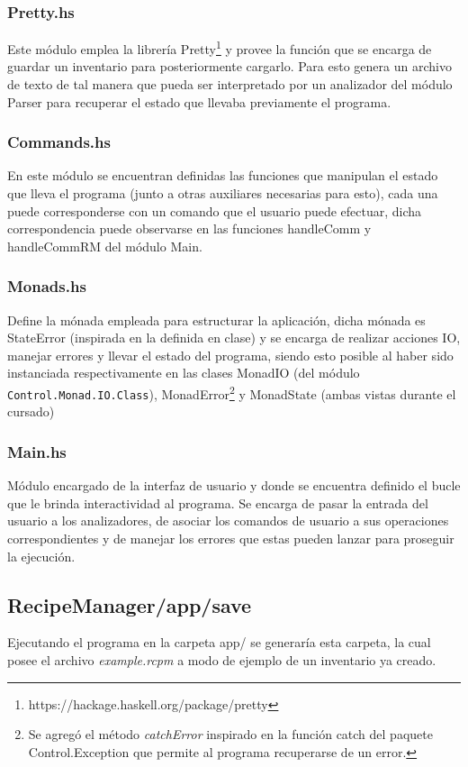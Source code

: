 \documentclass[a4paper]{article}
\begin{document}
\subsubsection*{\small{Pretty.hs}} 
Este módulo emplea la librería Pretty\footnote{https://hackage.haskell.org/package/pretty} y provee la función que se encarga de guardar un inventario para posteriormente cargarlo. Para esto genera un archivo de texto de tal manera que pueda ser interpretado por un analizador del módulo Parser para recuperar el estado que llevaba previamente el programa.

\subsubsection*{\small{Commands.hs}}
En este módulo se encuentran definidas las funciones que manipulan el estado que lleva el programa (junto a otras auxiliares necesarias para esto), cada una puede corresponderse con un comando que el usuario puede efectuar, dicha correspondencia puede observarse en las funciones handleComm y handleCommRM del módulo Main.  

\subsubsection*{\small{Monads.hs}}
Define la mónada empleada para estructurar la aplicación, dicha mónada es StateError (inspirada en la definida en clase) y se encarga de realizar acciones IO, manejar errores y llevar el estado del programa, siendo esto posible al haber sido instanciada respectivamente en las clases MonadIO (del módulo \texttt{Control.Monad.IO.Class}), MonadError\footnote{Se agregó el método \textit {catchError} inspirado en la función catch del paquete Control.Exception que permite al programa recuperarse de un error.} y MonadState (ambas vistas durante el cursado)
 

\subsubsection*{\small{Main.hs}}
Módulo encargado de la interfaz de usuario y donde se encuentra definido el bucle que le brinda interactividad al programa. Se encarga de pasar la entrada del usuario a los analizadores, de asociar los comandos de usuario a sus operaciones correspondientes y de manejar los errores que estas pueden lanzar para proseguir la ejecución. 

\subsection*{RecipeManager/app/save}
Ejecutando el programa en la carpeta app/ se generaría esta carpeta, la cual posee el archivo \textit {example.rcpm} a modo de ejemplo de un inventario ya creado.
\end{document}
